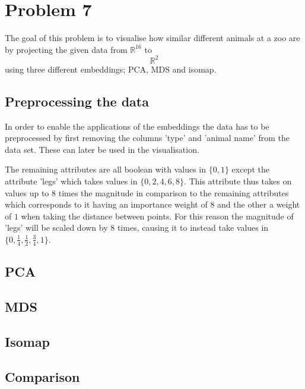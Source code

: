 \section*{Problem 7}
The goal of this problem is to visualise how similar different animals at a zoo are by projecting the given data from $\mathbb{R}^{16}$ to $$\mathbb{R}^{2}$$ using three different embeddings; PCA, MDS and isomap.

\subsection*{Preprocessing the data}
In order to enable the applications of the embeddings the data has to be preprocessed by first removing the columns 'type' and 'animal name' from the data set. These can later be used in the visualisation.

The remaining attributes are all boolean with values in $\{ 0,1 \}$ except the attribute 'legs' which takes values in $\{ 0, 2, 4, 6, 8 \}$. This attribute thus takes on values up to $8$ times the magnitude in comparison to the remaining attributes which corresponds to it having an importance weight of $8$ and the other a weight of $1$ when taking the distance between points. For this reason the magnitude of 'legs' will be scaled down by $8$ times, causing it to instead take values in  $\{ 0, \frac{1}{4}, \frac{1}{2}, \frac{3}{4}, 1 \}$.

\subsection*{PCA}

\subsection*{MDS}

\subsection*{Isomap}


\subsection*{Comparison}
